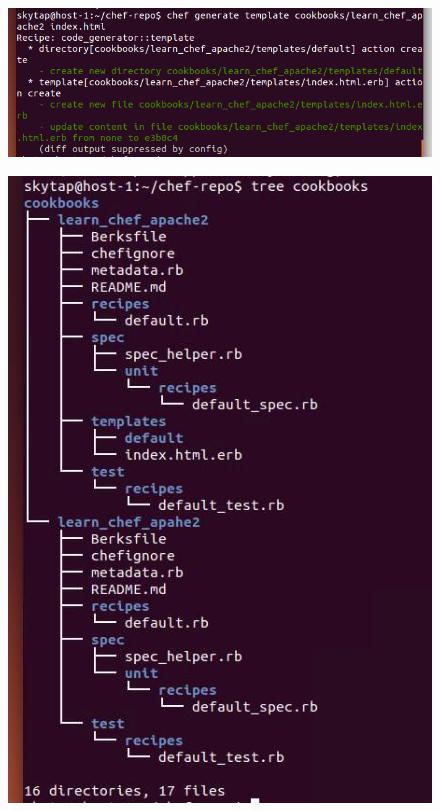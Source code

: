 \documentclass[12pt,letterpaper,boxed]{hmcpset}
\begin{document}
\begin{figure}[H]
  \centering
  \includegraphics[width = 1.0\textwidth]{28.png}
\end{figure}
\begin{figure}[H]
  \centering
  \includegraphics[width = 1.0\textwidth]{29.png}
\end{figure}
\end{document}
